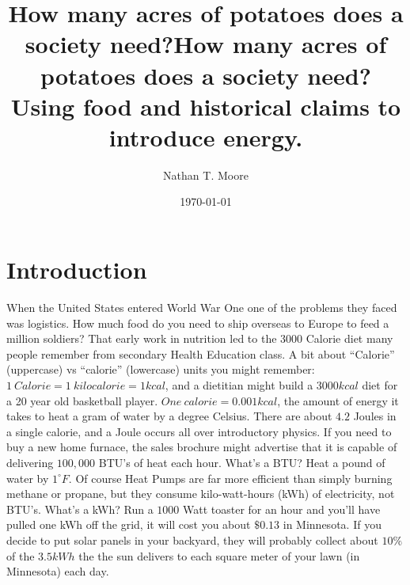 \documentclass[man]{apa7}
\begin{document}
\title{How many acres of potatoes does a society need?} 
\title{How many acres of potatoes does a society need? Using food and historical claims to introduce energy.}
\author{Nathan T. Moore}
\date{\today}

\maketitle

\section{Introduction}
When the United States entered World War One one of the problems they faced was logistics.  How much food do you need to ship overseas to Europe to feed a million soldiers?  That early work in nutrition led to the $3000$ Calorie diet many people remember from secondary Health Education class.  A bit about ``Calorie'' (uppercase) vs ``calorie'' (lowercase) units you might remember: $1~Calorie = 1~kilocalorie=1 kcal$, and a dietitian might build a $3000 kcal$ diet for a 20 year old basketball player. $One~ calorie = 0.001kcal$, the amount of energy it takes  to heat a gram of water by a degree Celsius.  There are about $4.2$ Joules in a single calorie, and a Joule occurs all over introductory  physics.  If you need to buy a new home furnace, the sales brochure might advertise that it is capable of delivering $100,000$ BTU's of heat each hour.  What's a BTU? Heat a pound of water by $1^{\circ}F$.  Of course Heat Pumps are far more efficient than simply burning methane or propane, but they consume kilo-watt-hours (kWh) of electricity, not BTU's.  What's a kWh?  Run a $1000$ Watt toaster for an hour and you'll have pulled one kWh off the grid, it will cost you about $\$0.13$ in Minnesota.  If you decide to put solar panels in your backyard, they will probably collect about $10\%$ of the $3.5kWh$ the  the sun delivers to each square meter of your lawn (in Minnesota) each day.  
\end{document}
